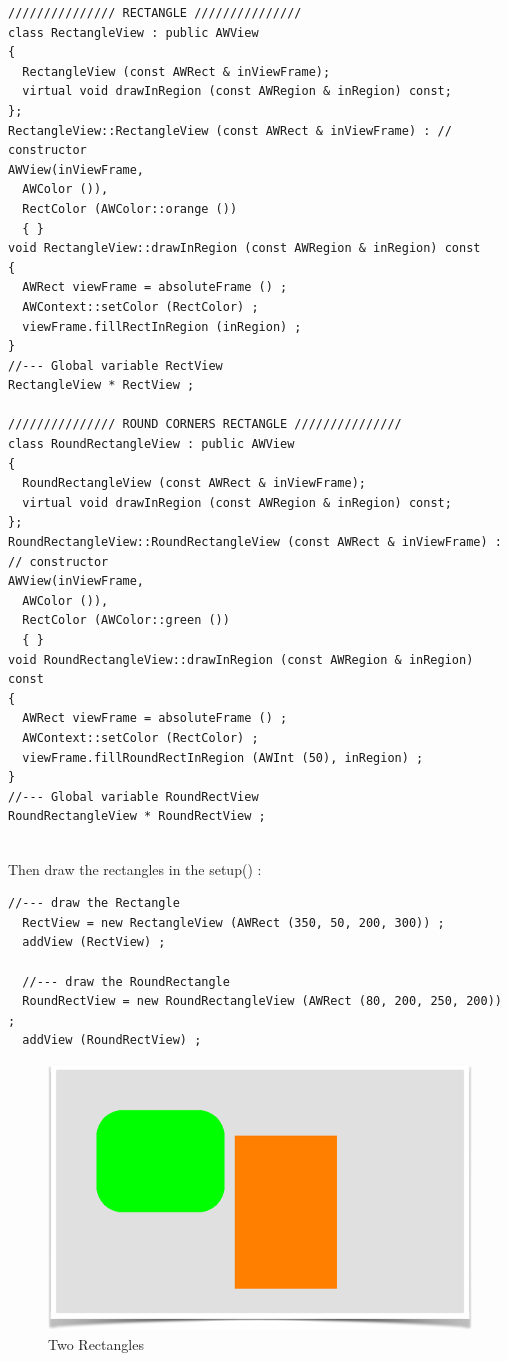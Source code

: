 \documentclass[a4paper,11pt]{extarticle}
\begin{document}
\begin{lstlisting}[language=Arduinonl]
/////////////// RECTANGLE ///////////////
class RectangleView : public AWView
{
  RectangleView (const AWRect & inViewFrame);
  virtual void drawInRegion (const AWRegion & inRegion) const;
};
RectangleView::RectangleView (const AWRect & inViewFrame) : // constructor
AWView(inViewFrame, 
  AWColor ()),             
  RectColor (AWColor::orange ()) 
  { }
void RectangleView::drawInRegion (const AWRegion & inRegion) const
{
  AWRect viewFrame = absoluteFrame () ;
  AWContext::setColor (RectColor) ;
  viewFrame.fillRectInRegion (inRegion) ;
}
//--- Global variable RectView
RectangleView * RectView ;

/////////////// ROUND CORNERS RECTANGLE ///////////////
class RoundRectangleView : public AWView
{
  RoundRectangleView (const AWRect & inViewFrame);
  virtual void drawInRegion (const AWRegion & inRegion) const;
};
RoundRectangleView::RoundRectangleView (const AWRect & inViewFrame) : // constructor
AWView(inViewFrame, 
  AWColor ()),             
  RectColor (AWColor::green ()) 
  { }
void RoundRectangleView::drawInRegion (const AWRegion & inRegion) const
{
  AWRect viewFrame = absoluteFrame () ;
  AWContext::setColor (RectColor) ;
  viewFrame.fillRoundRectInRegion (AWInt (50), inRegion) ;
}
//--- Global variable RoundRectView
RoundRectangleView * RoundRectView ;
\end{lstlisting}

~\\ Then draw the rectangles in the setup() :

\begin{lstlisting}[language=Arduinonl]
  //--- draw the Rectangle
  RectView = new RectangleView (AWRect (350, 50, 200, 300)) ;
  addView (RectView) ;   
  
  //--- draw the RoundRectangle
  RoundRectView = new RoundRectangleView (AWRect (80, 200, 250, 200)) ;
  addView (RoundRectView) ;   
\end{lstlisting}

\begin{figure}[htbp]
   \centering
   \includegraphics[scale=0.7]{AWFig7.png} 
   \caption{Two Rectangles}
   \label{fig:7}
\end{figure}
\end{document}
